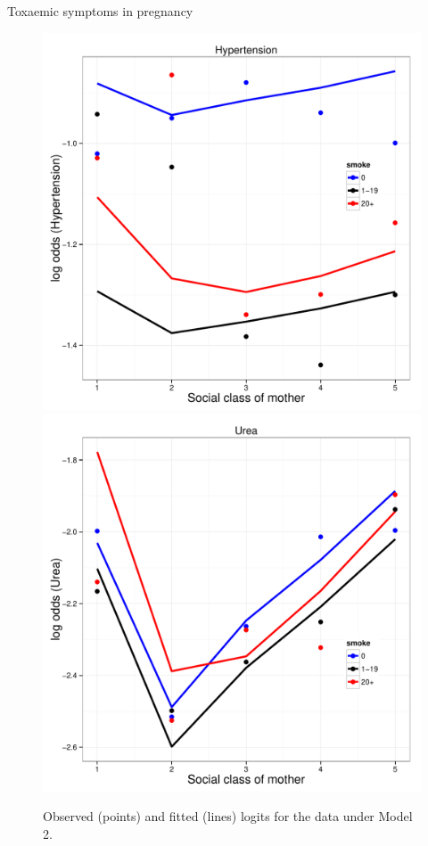 \documentclass[11pt]{book}\usepackage[]{graphicx}\usepackage[]{color}
\begin{document}
\begin{Example}[toxaemia]{Toxaemic symptoms in pregnancy}
\begin{figure}
\centering
\includegraphics[width=.49\textwidth]{ch08/fig/tox-glm-logits1}
\includegraphics[width=.49\textwidth]{ch08/fig/tox-glm-logits2}
\caption{Observed (points) and fitted (lines) logits for the  data under Model 2.}
\label{fig:tox-glm-logits1}
\end{figure}


\end{Example}
\end{document}
